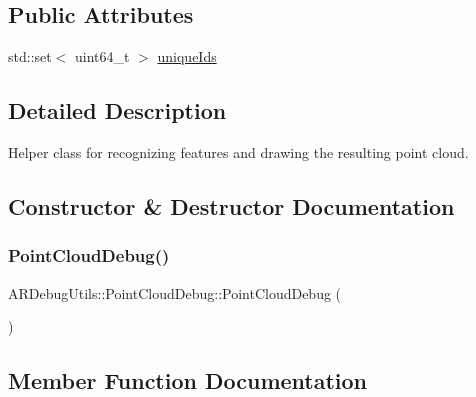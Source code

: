 \subsection*{Public Attributes}
\begin{DoxyCompactItemize}
\item 
std\+::set$<$ uint64\+\_\+t $>$ \mbox{\hyperlink{class_a_r_debug_utils_1_1_point_cloud_debug_a6405deec8e383af9b59593e7e207d1cf}{unique\+Ids}}
\end{DoxyCompactItemize}


\subsection{Detailed Description}
Helper class for recognizing features and drawing the resulting point cloud. 

\subsection{Constructor \& Destructor Documentation}
\mbox{\label{class_a_r_debug_utils_1_1_point_cloud_debug_a7de6576b45c662cddc632e7b9d7c9bd7}} 
\subsubsection{\texorpdfstring{Point\+Cloud\+Debug()}{PointCloudDebug()}}
{\footnotesize\ttfamily A\+R\+Debug\+Utils\+::\+Point\+Cloud\+Debug\+::\+Point\+Cloud\+Debug (\begin{DoxyParamCaption}{ }\end{DoxyParamCaption})\hspace{0.3cm}{\ttfamily [inline]}}



\subsection{Member Function Documentation}
\mbox{\label{class_a_r_debug_utils_1_1_point_cloud_debug_a308b87459dd4f0fc89f25bc65ad7b383}} 
